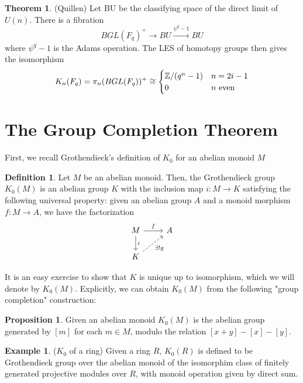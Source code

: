 \documentclass{article}
\theoremstyle{definition}
\newtheorem{theorem}{Theorem}[section]
\theoremstyle{definition}
\newtheorem{definition}{Definition}[theorem]
\theoremstyle{definition}
\theoremstyle{definition}
\newtheorem{proposition}{Proposition}[theorem]
\theoremstyle{definition}
\theoremstyle{definition}
\theoremstyle{definition}
\newtheorem{example}{Example}[theorem]
\begin{document}
\begin{tcolorbox}[colback=red!5!white,colframe=red!30!white]
\begin{theorem}
    (Quillen) Let BU be the classifying space of the direct limit of $U(n)$. There is a fibration
    \[
    BGL(F_q)^+\xrightarrow{}BU\xrightarrow{\psi^q-1}BU
    \]
    where $\psi^q-1$ is the Adams operation. The LES of homotopy groups then gives the isomorphism
    \[
    K_n(F_q)=\pi_n(BGL(F_q))^+\cong
    \begin{cases}
    \mathbb{Z}/(q^n-1)& n=2i-1\\
    0& n \textup{ even}
    \end{cases}
    \]
\end{theorem}
\end{tcolorbox}
\section{The Group Completion Theorem }
First, we recall Grothendieck's definition of $K_0$ for an abelian monoid $M$
\begin{tcolorbox}[colback=purple!5!white,colframe=purple!75!black]
    \begin{definition}
        Let $M$ be an abelian monoid. Then, the Grothendieck group $K_0(M)$ is an abelian group $K$ with the inclusion map $i: M\to K$ satisfying the following universal property: given an abelian group $A$ and a monoid morphism $f: M\to A$, we have the factorization
        \[\begin{tikzcd}
        M\arrow[d,"i"]\arrow[r," f"]&A\\
        K\arrow[ur,dashed,swap,"\exists! g"]
        \end{tikzcd}\]
    \end{definition}
    \end{tcolorbox}
It is an easy exercise to show that $K$ is unique up to isomorphism, which we will denote by $K_0(M)$. Explicitly, we can obtain $K_0(M)$ from the following "group completion" construction: 

\begin{tcolorbox}[colback=blue!5!white,colframe=blue!30!white]
\begin{proposition}
Given an abelian monoid $K_0(M)$ is the abelian group generated by $[m]$ for each $m\in M$, modulo the relation $[x+y]-[x]-[y]$.
\end{proposition}
\end{tcolorbox}


\begin{tcolorbox}[colback=yellow!5!white,colframe=yellow!30!white]
\begin{example}
($K_0$ of a ring) Given a ring $R$, $K_0(R)$ is defined to be Grothendieck group over the abelian monoid of the isomorphim class of finitely generated projective modules over $R$, with monoid operation given by direct sum. 
\end{example}
\end{tcolorbox}
\end{document}
